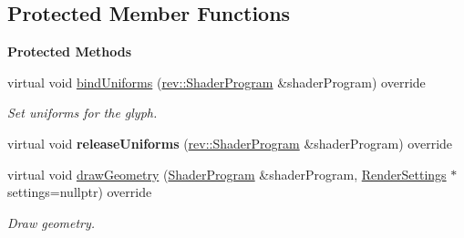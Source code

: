 \subsection*{Protected Member Functions}
\begin{Indent}\textbf{ Protected Methods}\par
\begin{DoxyCompactItemize}
\item 
\mbox{\label{classrev_1_1_debug_grid_a106613ad8d2f1bd832088ba91eb2c703}} 
virtual void \mbox{\hyperlink{classrev_1_1_debug_grid_a106613ad8d2f1bd832088ba91eb2c703}{bind\+Uniforms}} (\mbox{\hyperlink{classrev_1_1_shader_program}{rev\+::\+Shader\+Program}} \&shader\+Program) override
\begin{DoxyCompactList}\small\item\em Set uniforms for the glyph. \end{DoxyCompactList}\item 
\mbox{\label{classrev_1_1_debug_grid_a5a7148ba3a08893f524008022ee3316a}} 
virtual void {\bfseries release\+Uniforms} (\mbox{\hyperlink{classrev_1_1_shader_program}{rev\+::\+Shader\+Program}} \&shader\+Program) override
\item 
\mbox{\label{classrev_1_1_debug_grid_aa0c8086875438adcf3099e0c50c43a4b}} 
virtual void \mbox{\hyperlink{classrev_1_1_debug_grid_aa0c8086875438adcf3099e0c50c43a4b}{draw\+Geometry}} (\mbox{\hyperlink{classrev_1_1_shader_program}{Shader\+Program}} \&shader\+Program, \mbox{\hyperlink{classrev_1_1_render_settings}{Render\+Settings}} $\ast$settings=nullptr) override
\begin{DoxyCompactList}\small\item\em Draw geometry. \end{DoxyCompactList}\end{DoxyCompactItemize}
\end{Indent}
